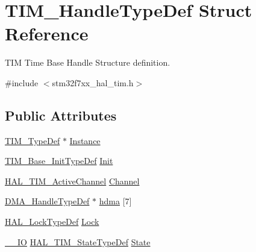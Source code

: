 \hypertarget{struct_t_i_m___handle_type_def}{}\section{T\+I\+M\+\_\+\+Handle\+Type\+Def Struct Reference}
\label{struct_t_i_m___handle_type_def}


T\+IM Time Base Handle Structure definition.  




{\ttfamily \#include $<$stm32f7xx\+\_\+hal\+\_\+tim.\+h$>$}

\subsection*{Public Attributes}
\begin{DoxyCompactItemize}
\item 
\mbox{\hyperlink{struct_t_i_m___type_def}{T\+I\+M\+\_\+\+Type\+Def}} $\ast$ \mbox{\hyperlink{struct_t_i_m___handle_type_def_ad0c5f736a15f6d8d14724854c8133bcc}{Instance}}
\item 
\mbox{\hyperlink{struct_t_i_m___base___init_type_def}{T\+I\+M\+\_\+\+Base\+\_\+\+Init\+Type\+Def}} \mbox{\hyperlink{struct_t_i_m___handle_type_def_a8b2e61c3c4128e62cb7be7d35048152e}{Init}}
\item 
\mbox{\hyperlink{group___t_i_m___exported___types_gaa3fa7bcbb4707f1151ccfc90a8cf9706}{H\+A\+L\+\_\+\+T\+I\+M\+\_\+\+Active\+Channel}} \mbox{\hyperlink{struct_t_i_m___handle_type_def_ae9c5a11c1f5b27c808c0aca453e63870}{Channel}}
\item 
\mbox{\hyperlink{group___d_m_a___exported___types_ga41b754a906b86bce54dc79938970138b}{D\+M\+A\+\_\+\+Handle\+Type\+Def}} $\ast$ \mbox{\hyperlink{struct_t_i_m___handle_type_def_a15338c71de82fa178c685be868e694bd}{hdma}} \mbox{[}7\mbox{]}
\item 
\mbox{\hyperlink{stm32f7xx__hal__def_8h_ab367482e943333a1299294eadaad284b}{H\+A\+L\+\_\+\+Lock\+Type\+Def}} \mbox{\hyperlink{struct_t_i_m___handle_type_def_a2a24b963b57150ed2fb0f051cd87b65a}{Lock}}
\item 
\mbox{\hyperlink{core__sc300_8h_aec43007d9998a0a0e01faede4133d6be}{\+\_\+\+\_\+\+IO}} \mbox{\hyperlink{group___t_i_m___exported___types_gae0994cf5970e56ca4903e9151f40010c}{H\+A\+L\+\_\+\+T\+I\+M\+\_\+\+State\+Type\+Def}} \mbox{\hyperlink{struct_t_i_m___handle_type_def_a6b6eeaf94f2e6e3d0a5bdac44adf21d6}{State}}
\end{DoxyCompactItemize}


